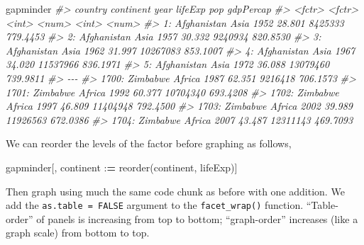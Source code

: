 \documentclass[
]{book}
\newenvironment{Shaded}{\begin{snugshade}}{\end{snugshade}}
\newcommand{\CommentTok}[1]{\textcolor[rgb]{0.56,0.35,0.01}{\textit{#1}}}
\newcommand{\ErrorTok}[1]{\textcolor[rgb]{0.64,0.00,0.00}{\textbf{#1}}}
\newcommand{\FunctionTok}[1]{\textcolor[rgb]{0.00,0.00,0.00}{#1}}
\newcommand{\NormalTok}[1]{#1}
\newcommand{\SpecialCharTok}[1]{\textcolor[rgb]{0.00,0.00,0.00}{#1}}
\begin{document}
\begin{Shaded}
\begin{Highlighting}[]
\NormalTok{gapminder}
\CommentTok{\#\textgreater{}           country continent  year lifeExp      pop gdpPercap}
\CommentTok{\#\textgreater{}            \textless{}fctr\textgreater{}    \textless{}fctr\textgreater{} \textless{}int\textgreater{}   \textless{}num\textgreater{}    \textless{}int\textgreater{}     \textless{}num\textgreater{}}
\CommentTok{\#\textgreater{}    1: Afghanistan      Asia  1952  28.801  8425333  779.4453}
\CommentTok{\#\textgreater{}    2: Afghanistan      Asia  1957  30.332  9240934  820.8530}
\CommentTok{\#\textgreater{}    3: Afghanistan      Asia  1962  31.997 10267083  853.1007}
\CommentTok{\#\textgreater{}    4: Afghanistan      Asia  1967  34.020 11537966  836.1971}
\CommentTok{\#\textgreater{}    5: Afghanistan      Asia  1972  36.088 13079460  739.9811}
\CommentTok{\#\textgreater{}   {-}{-}{-}                                                       }
\CommentTok{\#\textgreater{} 1700:    Zimbabwe    Africa  1987  62.351  9216418  706.1573}
\CommentTok{\#\textgreater{} 1701:    Zimbabwe    Africa  1992  60.377 10704340  693.4208}
\CommentTok{\#\textgreater{} 1702:    Zimbabwe    Africa  1997  46.809 11404948  792.4500}
\CommentTok{\#\textgreater{} 1703:    Zimbabwe    Africa  2002  39.989 11926563  672.0386}
\CommentTok{\#\textgreater{} 1704:    Zimbabwe    Africa  2007  43.487 12311143  469.7093}
\end{Highlighting}
\end{Shaded}

We can reorder the levels of the factor before graphing as follows,

\begin{Shaded}
\begin{Highlighting}[]
\NormalTok{gapminder[, continent }\SpecialCharTok{:}\ErrorTok{=} \FunctionTok{reorder}\NormalTok{(continent, lifeExp)]}
\end{Highlighting}
\end{Shaded}

Then graph using much the same code chunk as before with one addition. We add the \texttt{as.table\ =\ FALSE} argument to the \texttt{facet\_wrap()} function. ``Table-order'' of panels is increasing from top to bottom; ``graph-order'' increases (like a graph scale) from bottom to top.
\end{document}
